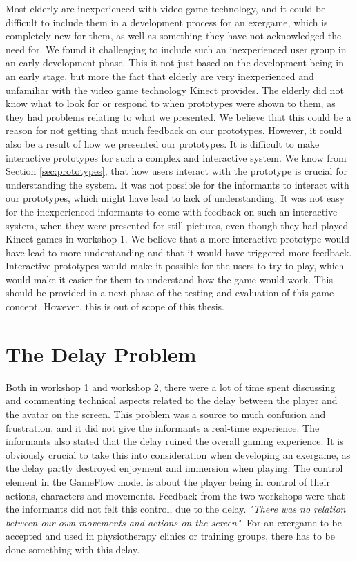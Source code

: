 Most elderly are inexperienced with video game technology, and it could be difficult to include them in a development process for an exergame, which is completely new for them, as well as something they have not acknowledged the need for. We found it challenging to include such an inexperienced user group in an early development phase. This it not just based on the development being in an early stage, but more the fact that elderly are very inexperienced and unfamiliar with the video game technology Kinect provides. The elderly did not know what to look for or respond to when prototypes were shown to them, as they had problems relating to what we presented. We believe that this could be a reason for not getting that much feedback on our prototypes. However, it could also be a result of how we presented our prototypes. It is difficult to make interactive prototypes for such a complex and interactive system. We know from Section \ref{sec:prototypes}, that how users interact with the prototype is crucial for understanding the system. It was not possible for the informants to interact with our prototypes, which might have lead to lack of understanding. It was not easy for the inexperienced informants to come with feedback on such an interactive system, when they were presented for still pictures, even though they had played Kinect games in workshop 1. We believe that a more interactive prototype would have lead to more understanding and that it would have triggered more feedback. Interactive prototypes would make it possible for the users to try to play, which would make it easier for them to understand how the game would work. This should be provided in a next phase of the testing and evaluation of this game concept. However, this is out of scope of this thesis.  
 
 
\section{The Delay Problem}
\label{sec:delay}
Both in workshop 1 and workshop 2, there were a lot of time spent discussing and commenting technical aspects related to the delay between the player and the avatar on the screen. This problem was a source to much confusion and frustration, and it did not give the informants a real-time experience. The informants also stated that the delay ruined the overall gaming experience. It is obviously crucial to take this into consideration when developing an exergame, as the delay partly destroyed enjoyment and immersion when playing. The control element in the GameFlow model \cite{sweetser} is about the player being in control of their actions, characters and movements. Feedback from the two workshops were that the informants did not felt this control, due to the delay. \emph{"There was no relation between our own movements and actions on the screen"}. For an exergame to be accepted and used in physiotherapy clinics or training groups, there has to be done something with this delay. 

